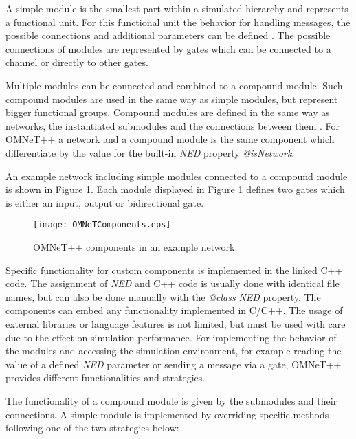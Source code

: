A simple module is the smallest part within a simulated hierarchy and represents a functional unit.
For this functional unit the behavior for handling messages, the possible connections and additional parameters can be defined \cite[section 3.3]{omnet_manual}.
The possible connections of modules are represented by gates which can be connected to a channel or directly to other gates.

Multiple modules can be connected and combined to a compound module.
Such compound modules are used in the same way as simple modules, but represent bigger functional groups.
Compound modules are defined in the same way as networks, the instantiated submodules and the connections between them \cite[section 3.4]{omnet_manual}.
For OMNeT++ a network and a compound module is the same component which differentiate by the value for the built-in \emph{NED} property \emph{@isNetwork}.

An example network including simple modules connected to a compound module is shown in Figure \ref{fig:OMNeTComponents}.
Each module displayed in Figure \ref{fig:OMNeTComponents} defines two gates which is either an input, output or bidirectional gate.

\begin{figure}
    \centering
    \texttt{[image: OMNeTComponents.eps]}
    \caption{OMNeT++ components in an example network}
    \label{fig:OMNeTComponents}
\end{figure}

Specific functionality for custom components is implemented in the linked C++ code.
The assignment of \emph{NED} and C++ code is usually done with identical file names, but can also be done manually with the \emph{@class} \emph{NED} property.
The components can embed any functionality implemented in C/C++.
The usage of external libraries or language features is not limited, but must be used with care due to the effect on simulation performance.
For implementing the behavior of the modules and accessing the simulation environment, for example reading the value of a defined \emph{NED} parameter or sending a message via a gate, 
OMNeT++ provides different functionalities and strategies.

The functionality of a compound module is given by the submodules and their connections.
A simple module is implemented by overriding specific methods following one of the two strategies below:

